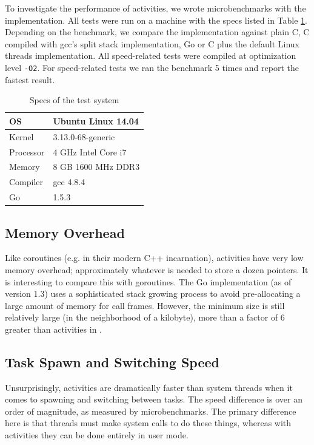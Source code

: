 \documentclass[acmsmall,anonymous,review]{acmart}\settopmatter{printfolios=true,printccs=false,printacmref=false}
\begin{document}
To investigate the performance of activities, we wrote microbenchmarks with the \charcoal{} implementation.
All tests were run on a machine with the specs listed in Table \ref{table:specs}.
Depending on the benchmark, we compare the \charcoal{} implementation against plain C, C compiled with gcc's split stack implementation, Go or C plus the default Linux threads implementation.
All speed-related tests were compiled at optimization level \texttt{-O2}.
For speed-related tests we ran the benchmark 5 times and report the fastest result.

\begin{table}
  \centering
  \begin{tabular}{|l|l|}
    \hline
    OS & Ubuntu Linux 14.04 \\
    \hline
    Kernel & 3.13.0-68-generic \\
    \hline
    Processor & 4 GHz Intel Core i7 \\
    \hline
    Memory & 8 GB 1600 MHz DDR3 \\
    \hline
    Compiler & gcc 4.8.4 \\
    \hline
    Go & 1.5.3 \\
    \hline
  \end{tabular}
  \caption{Specs of the test system}
  \label{table:specs}
\end{table}

\subsection{Memory Overhead}

Like coroutines (e.g. in their modern C++ incarnation), activities have very low memory overhead; approximately whatever is needed to store a dozen pointers.
It is interesting to compare this with goroutines.
The Go implementation (as of version 1.3) uses a sophisticated stack growing process to avoid pre-allocating a large amount of memory for call frames.
However, the minimum size is still relatively large (in the neighborhood of a kilobyte), more than a factor of 6 greater than activities in \charcoal{}.

\subsection{Task Spawn and Switching Speed}

Unsurprisingly, activities are dramatically faster than system threads when it comes to spawning and switching between tasks.
The speed difference is over an order of magnitude, as measured by microbenchmarks.
The primary difference here is that threads must make system calls to do these things, whereas with activities they can be done entirely in user mode.
\end{document}
